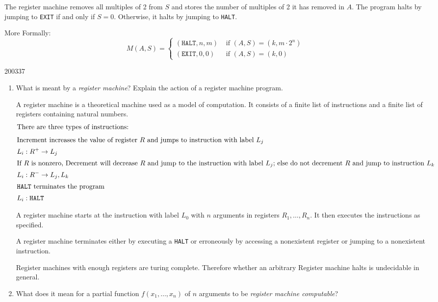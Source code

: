 \documentclass[10pt,\jkfside,a4paper]{article}
\begin{document}
\begin{enumerate}
The register machine removes all multiples of 2 from $S$ and stores the
number of multiples of 2 it has removed in $A$. The program halts by jumping
to \texttt{EXIT} if and only if $S = 0$. Otherwise, it halts by jumping to
\texttt{HALT}.

More Formally:
\[
M(A, S) =
\begin{cases}
(\texttt{HALT}, n, m) & \text{ if } (A, S) = (k, m \cdot 2^n) \\
(\texttt{EXIT}, 0, 0) & \text{ if } (A, S) = (k, 0)
\end{cases}
\]

\end{enumerate}

\begin{examquestion}{2003}{3}{7}

\begin{enumerate}

\item What is meant by a \textit{register machine}? Explain the action of a
register machine program.

A register machine is a theoretical machine used as a model of computation.
It consists of a finite list of instructions and a finite list of registers
containing natural numbers.
\begin{align*}
\intertext{There are three types of instructions:}
\intertext{Increment increases the value of register $R$ and jumps to
instruction with label $L_j$}
L_i &: R^+ \to L_j \\
\intertext{If $R$ is nonzero, Decrement will decrease $R$ and jump to
the instruction with label $L_j$; else do not decrement $R$ and jump to
instruction $L_k$}
L_i &: R^- \to L_j, L_k\\
\intertext{\texttt{HALT} terminates the program}
L_i &: \texttt{HALT}
\end{align*}

A register machine starts at the instruction with label $L_0$ with $n$
arguments in registers $R_1, \dots, R_n$. It then executes the instructions
as specified.

A register machine terminates either by executing a \texttt{HALT} or
erroneously by accessing a nonexistent register or jumping to a nonexistent
instruction.

Register machines with enough registers are turing complete. Therefore
whether an arbitrary Register machine halts is undecidable in general.

\item What does it mean for a partial function $f(x_1, \dots, x_n)$ of $n$
arguments to be \textit{register machine computable}?


\end{enumerate}
\end{examquestion}
\end{document}
